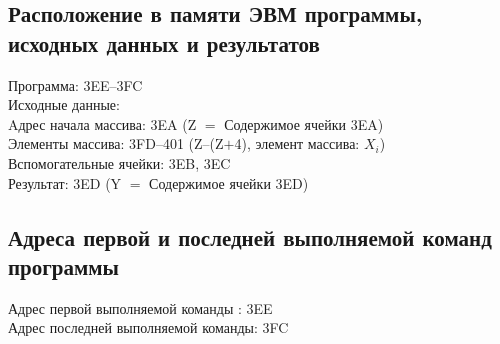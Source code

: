\subsection{Расположение в памяти ЭВМ программы, исходных данных и результатов}
\noindent Программа: 3EE--3FC \\
Исходные данные: \\
Aдрес начала массива: 3EA (Z $=$ Содержимое ячейки 3EA) \\
Элементы массива: 3FD--401 (Z--(Z$+$4), элемент массива: $X_{i}$) \\
Вспомогательные ячейки: 3EB, 3EC \\
Результат: 3ED (Y $=$ Содержимое ячейки 3ED)

\subsection{Адреса первой и последней выполняемой команд программы}
\noindent Адрес первой выполняемой команды : 3EE \\
Адрес последней выполняемой команды: 3FC

